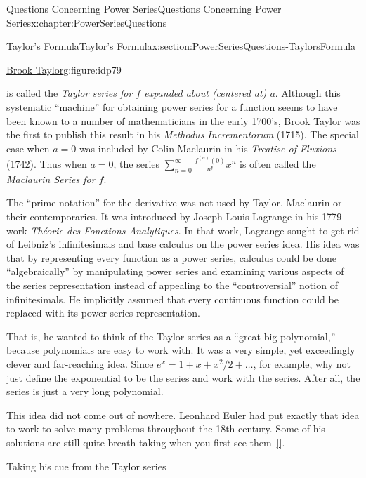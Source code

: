 \begin{chapterptx}{Questions Concerning Power Series}{}{Questions Concerning Power Series}{}{}{x:chapter:PowerSeriesQuestions}
\begin{sectionptx}{Taylor's Formula}{}{Taylor's Formula}{}{}{x:section:PowerSeriesQuestions-TaylorsFormula}
\begin{figureptx}{\href{https://mathshistory.st-andrews.ac.uk/Biographies/Taylor/}{Brook Taylor}\protect\footnotemark{}}{g:figure:idp79}{}
\begin{image}{0.325}{0.35}{0.325}
			\end{image}%
			\tcblower
		\end{figureptx}%
		is called the \emph{\alert{Taylor series} for \(f\) expanded about (centered at) \(a\)}. Although this systematic ``machine'' for obtaining power series for a function seems to have been known to a number of mathematicians in the early 1700's, Brook Taylor  was the first to publish this result in his \textit{Methodus Incrementorum} (1715). The special case when \(a=0\) was included by Colin Maclaurin  in his \emph{Treatise of Fluxions} (1742). Thus when \(a=0\), the series \(\sum_{n=0}^\infty\frac{f^{(n)}(0)}{n!}x^n\) is often called the \emph{Maclaurin Series for \(f\)}.%
		\par
		The ``prime notation'' for the derivative was not used by Taylor,  Maclaurin or their contemporaries. It was introduced by Joseph Louis Lagrange  in his 1779 work \textit{Théorie des Fonctions Analytiques}. In that work, Lagrange sought to get rid of Leibniz's infinitesimals and base calculus on the power series idea. His idea was that by representing every function as a power series, calculus could be done ``algebraically'' by manipulating power series and examining various aspects of the series representation instead of appealing to the ``controversial'' notion of infinitesimals. He implicitly assumed that every continuous function could be replaced with its power series representation.%
		\par
		That is, he wanted to think of the Taylor series as a ``great big polynomial,'' because polynomials are easy to work with. It was a very simple, yet exceedingly clever and far-reaching idea. Since \(e^x = 1 +x +x^2/2 +\ldots\), for example, why not just define the exponential to be the series and work with the series. After all, the series is just a very long polynomial.%
		\par
		This idea did not come out of nowhere. Leonhard Euler  had put exactly that idea to work to solve many problems throughout the 18th century. Some of his solutions are still quite breath-taking when you first see them~\hyperlink{x:biblio:sandifer07__early_mathem_leonar_euler}{[{}]}.%
		\par
		Taking his cue from the Taylor series%
		\begin{equation*}

\end{equation*}
\end{sectionptx}
\end{chapterptx}
